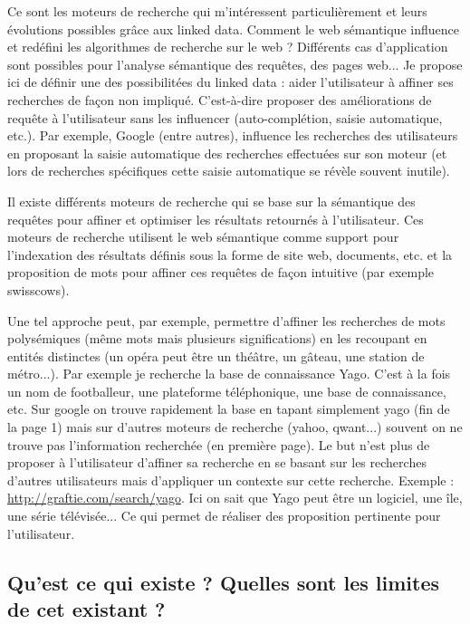 \documentclass[12pt]{article}
\begin{document}
Ce sont les moteurs de recherche qui m'intéressent particulièrement et leurs évolutions possibles grâce aux linked data. Comment le web sémantique influence et redéfini les algorithmes de recherche sur le web ? Différents cas d'application sont possibles pour l'analyse sémantique des requêtes, des pages web... Je propose ici de définir une des possibilitées du linked data : aider l'utilisateur à affiner ses recherches de façon non impliqué. C'est-à-dire proposer des améliorations de requête à l'utilisateur sans les influencer (auto-complétion, saisie automatique, etc.). Par exemple, Google (entre autres), influence les recherches des utilisateurs en proposant la saisie automatique des recherches effectuées sur son moteur (et lors de recherches spécifiques cette saisie automatique se révèle souvent inutile).

Il existe différents moteurs de recherche qui se base sur la sémantique des requêtes pour affiner et optimiser les résultats retournés à l'utilisateur. Ces moteurs de recherche utilisent le web sémantique comme support pour l'indexation des résultats définis sous la forme de site web, documents, etc. et la proposition de mots pour affiner ces requêtes de façon intuitive (par exemple swisscows).

Une tel approche peut, par exemple, permettre d'affiner les recherches de mots polysémiques (même mots mais plusieurs significations) en les recoupant en entités distinctes (un opéra peut être un théâtre, un gâteau, une station de métro...). \cite{open-yago} Par exemple je recherche la base de connaissance Yago. C'est à la fois un nom de footballeur, une plateforme téléphonique, une base de connaissance, etc. Sur google on trouve rapidement la base en tapant simplement yago (fin de la page 1) mais sur d'autres moteurs de recherche (yahoo, qwant...) souvent on ne trouve pas l'information recherchée (en première page). Le but n'est plus de proposer à l'utilisateur d'affiner sa recherche en se basant sur les recherches d'autres utilisateurs mais d'appliquer un contexte sur cette recherche. Exemple : \url{http://graftie.com/search/yago}. Ici on sait que Yago peut être un logiciel, une île, une série télévisée... Ce qui permet de réaliser des proposition pertinente pour l'utilisateur.

\subsection{Qu’est ce qui existe ? Quelles sont les limites de cet existant ?}
\end{document}

